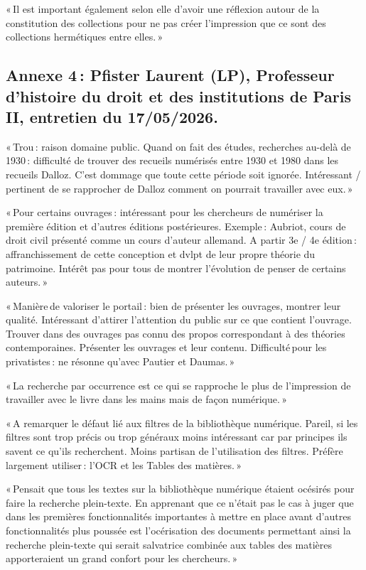 « Il est important également selon elle d’avoir une réflexion autour de la constitution des collections pour ne pas créer l’impression que ce sont des collections hermétiques entre elles. » 

\subsection*{Annexe 4 : Pfister Laurent (LP), Professeur d’histoire du droit et des institutions de Paris II, entretien du 17/05/2026.}

« Trou : raison domaine public. Quand on fait des études, recherches au-delà de 1930 : difficulté de trouver des recueils numérisés entre 1930 et 1980 dans les recueils Dalloz. C’est dommage que toute cette période soit ignorée. Intéressant / pertinent de se rapprocher de Dalloz comment on pourrait travailler avec eux. » 

« Pour certains ouvrages : intéressant pour les chercheurs de numériser la première édition et d’autres éditions postérieures. Exemple : Aubriot, cours de droit civil présenté comme un cours d’auteur allemand. A partir 3e / 4e édition : affranchissement de cette conception et dvlpt de leur propre théorie du patrimoine. Intérêt pas pour tous de montrer l’évolution de penser de certains auteurs. » 

« Manière de valoriser le portail : bien de présenter les ouvrages, montrer leur qualité. Intéressant d’attirer l’attention du public sur ce que contient l’ouvrage. Trouver dans des ouvrages pas connu des propos correspondant à des théories contemporaines. Présenter les ouvrages et leur contenu. Difficulté pour les privatistes : ne résonne qu’avec Pautier et Daumas. »  

« La recherche par occurrence est ce qui se rapproche le plus de l’impression de travailler avec le livre dans les mains mais de façon numérique. » 

« A remarquer le défaut lié aux filtres de la bibliothèque numérique. Pareil, si les filtres sont trop précis ou trop généraux moins intéressant car par principes ils savent ce qu’ils recherchent. Moins partisan de l’utilisation des filtres. Préfère largement utiliser : l’OCR et les Tables des matières. » 

« Pensait que tous les textes sur la bibliothèque numérique étaient océsirés pour faire la recherche plein-texte. En apprenant que ce n’était pas le cas à juger que dans les premières fonctionnalités importantes à mettre en place avant d’autres fonctionnalités plus poussée est l’océrisation des documents permettant ainsi la recherche plein-texte qui serait salvatrice combinée aux tables des matières apporteraient un grand confort pour les chercheurs. » 

